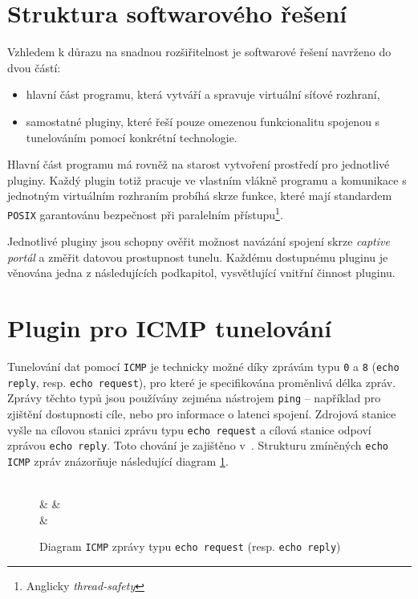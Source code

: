 \documentclass[thesis=M,czech]{FITthesis}[2012/10/20]
\begin{document}
\section{Struktura softwarového řešení}

Vzhledem k důrazu na snadnou rozšiřitelnost je softwarové řešení navrženo do dvou částí:

\begin{itemize}
 \item hlavní část programu, která vytváří a spravuje virtuální síťové rozhraní,
 \item samostatné pluginy, které řeší pouze omezenou funkcionalitu spojenou s tunelováním pomocí konkrétní technologie.
\end{itemize}

Hlavní část programu má rovněž na starost vytvoření prostředí pro jednotlivé pluginy. Každý plugin totiž pracuje ve vlastním vlákně programu a komunikace s jednotným virtuálním rozhraním probíhá skrze funkce, které mají standardem \texttt{POSIX} garantovánu bezpečnost při paralelním přístupu\footnote{Anglicky \textit{thread-safety}}.

Jednotlivé pluginy jsou schopny ověřit možnost navázání spojení skrze \textit{captive portál} a změřit datovou prostupnost tunelu. Každému dostupnému pluginu je věnována jedna z následujících podkapitol, vysvětlující vnitřní činnost pluginu.


\section{Plugin pro ICMP tunelování}

Tunelování dat pomocí \texttt{ICMP} je technicky možné díky zprávám typu \texttt{0} a \texttt{8} (\texttt{echo reply}, resp. \texttt{echo request}), pro které je specifikována proměnlivá délka zpráv. Zprávy těchto typů jsou používány zejména nástrojem \texttt{ping} -- například pro zjištění dostupnosti cíle, nebo pro informace o latenci spojení. Zdrojová stanice vyšle na cílovou stanici zprávu typu \texttt{echo request} a cílová stanice odpoví zprávou \texttt{echo reply}. Toto chování je zajištěno v~\cite[RFC1122]{rfc1122}. Strukturu zmíněných \texttt{echo} \texttt{ICMP} zpráv znázorňuje následující diagram \ref{diag:icmp-packet}.


    \begin{figure}[h]
    \centering
	\begin{bytefield}[bitwidth=1em]{32}
	    \\
	     &  & 
	    \\
	     & 
	    \\
	\end{bytefield}
	\caption{Diagram \texttt{ICMP} zprávy typu \texttt{echo request} (resp. \texttt{echo reply})}
	\label{diag:icmp-packet}
    \end{figure}
    
\end{document}
